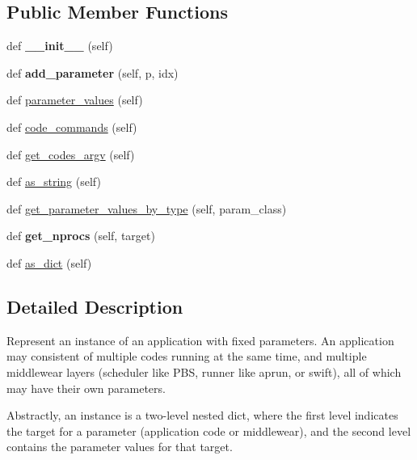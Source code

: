 \subsection*{Public Member Functions}
\begin{DoxyCompactItemize}
\item 
\mbox{\label{classcodar_1_1cheetah_1_1parameters_1_1_instance_abc52192d373d1741efd7566d320d68c1}} 
def {\bfseries \+\_\+\+\_\+init\+\_\+\+\_\+} (self)
\item 
\mbox{\label{classcodar_1_1cheetah_1_1parameters_1_1_instance_a600511535b03f1796f9a0d84b654e113}} 
def {\bfseries add\+\_\+parameter} (self, p, idx)
\item 
def \hyperlink{classcodar_1_1cheetah_1_1parameters_1_1_instance_a4a943c0f5f3afe8b9a4ff9b238aab766}{parameter\+\_\+values} (self)
\item 
def \hyperlink{classcodar_1_1cheetah_1_1parameters_1_1_instance_a417d9d44a5eb0e0b8812fc427ddc4435}{code\+\_\+commands} (self)
\item 
def \hyperlink{classcodar_1_1cheetah_1_1parameters_1_1_instance_a4ee126bbceeb792914185ca9fbe59101}{get\+\_\+codes\+\_\+argv} (self)
\item 
def \hyperlink{classcodar_1_1cheetah_1_1parameters_1_1_instance_a053717fc3ee7840a7c32173f15e99ae3}{as\+\_\+string} (self)
\item 
def \hyperlink{classcodar_1_1cheetah_1_1parameters_1_1_instance_ab1187231851e554aa1e95f7e7eee7b77}{get\+\_\+parameter\+\_\+values\+\_\+by\+\_\+type} (self, param\+\_\+class)
\item 
\mbox{\label{classcodar_1_1cheetah_1_1parameters_1_1_instance_add69b3c4bcc37530ba16bd77cd843872}} 
def {\bfseries get\+\_\+nprocs} (self, target)
\item 
def \hyperlink{classcodar_1_1cheetah_1_1parameters_1_1_instance_ae978374d4b5e01c2764b9513ae38a961}{as\+\_\+dict} (self)
\end{DoxyCompactItemize}


\subsection{Detailed Description}
\begin{DoxyVerb}Represent an instance of an application with fixed parameters. An
application may consistent of multiple codes running at the same time,
and multiple middlewear layers (scheduler like PBS, runner like aprun,
or swift), all of which may have their own parameters.

Abstractly, an instance is a two-level nested dict, where the first
level indicates the target for a parameter (application code or
middlewear), and the second level contains the parameter values for that
target.
\end{DoxyVerb}
 

